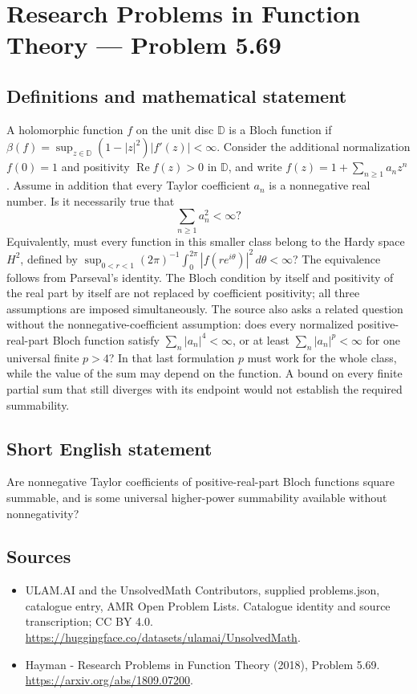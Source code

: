 \documentclass[11pt,a4paper]{article}
\begin{document}
\section*{Research Problems in Function Theory — Problem 5.69}\label{statement}

\subsection{Definitions and mathematical statement}
A holomorphic function $f$ on the unit disc $\mathbb D$ is a Bloch function if
$\beta(f)=\sup_{z\in\mathbb D}(1-|z|^2)|f'(z)|<\infty$.
Consider the additional normalization $f(0)=1$ and positivity $\operatorname{Re}f(z)>0$ in $\mathbb D$, and write $f(z)=1+\sum_{n\ge1}a_nz^n$.
Assume in addition that every Taylor coefficient $a_n$ is a nonnegative real number. Is it necessarily true that
\[
\sum_{n\ge1}a_n^2<\infty?
\]
Equivalently, must every function in this smaller class belong to the Hardy space $H^2$, defined by
$\sup_{0<r<1}(2\pi)^{-1}\int_0^{2\pi}|f(re^{i\theta})|^2\,d\theta<\infty$?
The equivalence follows from Parseval's identity. The Bloch condition by itself and positivity of the real part by itself are not replaced by coefficient positivity; all three assumptions are imposed simultaneously.
The source also asks a related question without the nonnegative-coefficient assumption: does every normalized positive-real-part Bloch function satisfy $\sum_n|a_n|^4<\infty$, or at least $\sum_n|a_n|^p<\infty$ for one universal finite $p>4$? In that last formulation $p$ must work for the whole class, while the value of the sum may depend on the function. A bound on every finite partial sum that still diverges with its endpoint would not establish the required summability.
\subsection{Short English statement}
Are nonnegative Taylor coefficients of positive-real-part Bloch functions square summable, and is some universal higher-power summability available without nonnegativity?
\subsection{Sources}
\begin{itemize}
\item[S1] ULAM.AI and the UnsolvedMath Contributors, supplied problems.json, catalogue entry, AMR Open Problem Lists. Catalogue identity and source transcription; CC BY 4.0.
\url{https://huggingface.co/datasets/ulamai/UnsolvedMath}.
\item[S2] Hayman - Research Problems in Function Theory (2018), Problem 5.69. 
\url{https://arxiv.org/abs/1809.07200}.
\end{itemize}
\end{document}
